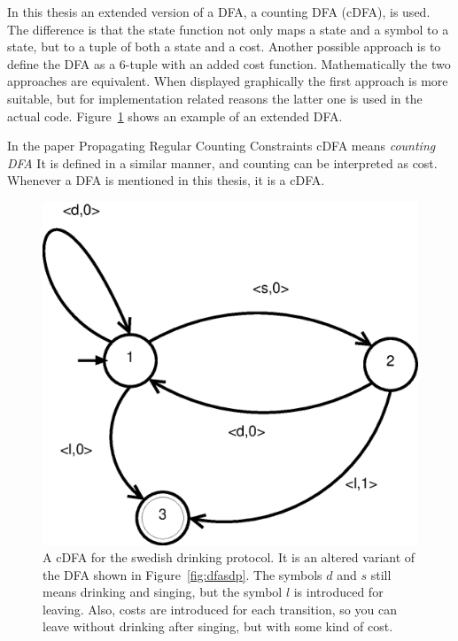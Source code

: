 \documentclass[a4paper,11pt]{article}
\begin{document}
In this thesis an extended version of a DFA, a counting DFA (cDFA), is used. The difference is that the state function not only maps a state and a symbol to a state, but to a tuple of both a state and a cost. Another possible approach is to define the DFA as a 6-tuple with an added cost function. Mathematically the two approaches are equivalent. When displayed graphically the first approach is more suitable, but for implementation related reasons the latter one is used in the actual code. Figure~\ref{fig:cdfasdp} shows an example of an extended DFA.

In the paper Propagating Regular Counting Constraints cDFA means \textit{counting DFA} It is defined in a similar manner, and counting can be interpreted as cost. Whenever a DFA is mentioned in this thesis, it is a cDFA.

\begin{figure}[H]
\centering
\includegraphics[scale=0.8]{cdfa.eps}
\caption{A cDFA for the swedish drinking protocol. It is an altered variant of the DFA shown in Figure~\ref{fig:dfasdp}. The symbols $d$ and $s$ still means drinking and singing, but the symbol $l$ is introduced for leaving. Also, costs are introduced for each transition, so you can leave without drinking after singing, but with some kind of cost.}
\label{fig:cdfasdp}
\end{figure}
\end{document}
